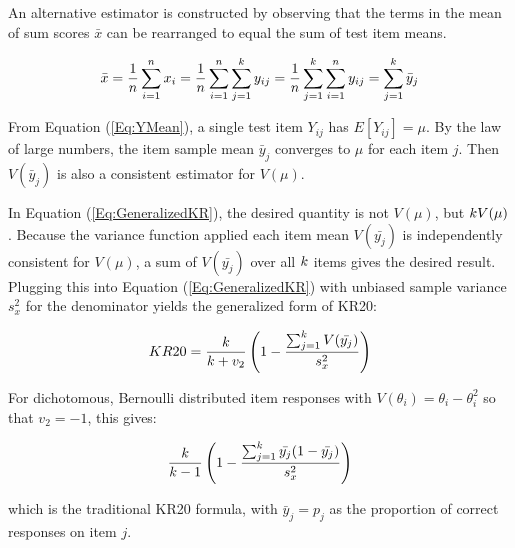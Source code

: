 \documentclass[12pt,epsfig]{article}
\newcommand{\changed}[1]{\textcolor{black}{#1}}
\newcommand{\numsubjects}{\changed{n}}%
\newcommand{\testlength}{\changed{k}}%
\begin{document}

An alternative estimator is constructed by observing that the terms in the mean of sum scores $\bar{x}$ can be rearranged to equal the sum of test item means.

\begin{equation}
\bar{x} = \frac{1}{\numsubjects} \sum_{i = 1}^{\numsubjects} x_i = \frac{1}{\numsubjects} \sum_{i = 1}^{\numsubjects}  \sum_{j = 1}^{\testlength} y_{ij} = \frac{1}{\numsubjects}  \sum_{j = 1}^{\testlength} \sum_{i = 1}^{\numsubjects} y_{ij} = \sum_{j = 1}^{\testlength} \bar{y}_j
\label{Eq:Sum}
\end{equation}

\noindent From Equation (\ref{Eq:YMean}), a single test item $Y_{ij}$ has $E[Y_{ij}] = \mu$. By the law of large numbers, the item sample mean $\bar{y}_j$ converges to $\mu$ for each item $j$. Then $V(\bar{y}_j)$ is also a consistent estimator for $V(\mu)$. %

In Equation (\ref{Eq:GeneralizedKR}), the desired quantity is not $V(\mu)$, but $\testlength V(\mu)$. Because the variance function applied each item mean $V(\bar{y_j})$ is independently consistent for $V(\mu)$, a sum of $V(\bar{y_j})$ over all $\testlength$ items gives the desired result. Plugging this into Equation (\ref{Eq:GeneralizedKR}) with unbiased sample variance $s^2_x$ for the denominator yields the generalized form of KR20:


\begin{equation}
KR20  = \dfrac{\testlength}{\testlength + v_2} \left(1 - \dfrac{ \sum_{j = 1}^{\testlength} V(\bar{y_j})}{s^2_x}\right)
\label{Eq:KR20}
\end{equation}

\noindent For dichotomous, Bernoulli distributed item responses with $V(\theta_i) = \theta_i - \theta_i^2$ so that $v_2 = -1$, this gives:

\begin{equation*}
\dfrac{\testlength}{\testlength-1}\left(1 - \dfrac{ \sum_{j = 1}^{\testlength} \bar{y_j}(1 - \bar{y_j})}{s^2_x}\right)
\end{equation*}

\noindent which is the traditional KR20 formula, with $\bar{y}_j = p_j$ as the proportion of correct responses on item $j$.
\end{document}
